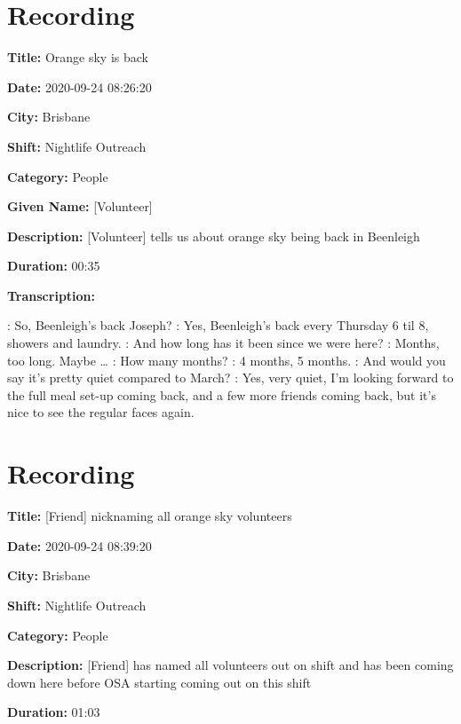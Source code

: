 {\tocless\section{Recording }

\textbf{Title:} Orange sky is back

\textbf{Date:} 2020-09-24 08:26:20

\textbf{City:} Brisbane

\textbf{Shift:} Nightlife Outreach

\textbf{Category:} People

\textbf{Given Name:} [Volunteer]

\textbf{Description:} [Volunteer] tells us about orange sky being back in Beenleigh

\textbf{Duration:} 00:35

\textbf{Transcription:}

\begin{drama}

    \volaspeaks: So, Beenleigh's back Joseph?
    \volbspeaks: Yes, Beenleigh's back every Thursday 6 til 8, showers and laundry.
    \volaspeaks: And how long has it been since we were here?
    \volbspeaks: Months, too long. Maybe \dots
    \volaspeaks: How many months?
    \volbspeaks: 4 months, 5 months.
    \volaspeaks: And would you say it's pretty quiet compared to March?
    \volbspeaks: Yes, very quiet, I'm looking forward to the full meal set-up coming back, and a few more friends coming back, but it's nice to see the regular faces again.
\end{drama}

\tocless\section{Recording }

\textbf{Title:} [Friend] nicknaming all orange sky volunteers

\textbf{Date:} 2020-09-24 08:39:20

\textbf{City:} Brisbane

\textbf{Shift:} Nightlife Outreach

\textbf{Category:} People

\textbf{Description:} [Friend] has named all volunteers out on shift and has been coming down here before OSA starting coming out on this shift

\textbf{Duration:} 01:03

}
